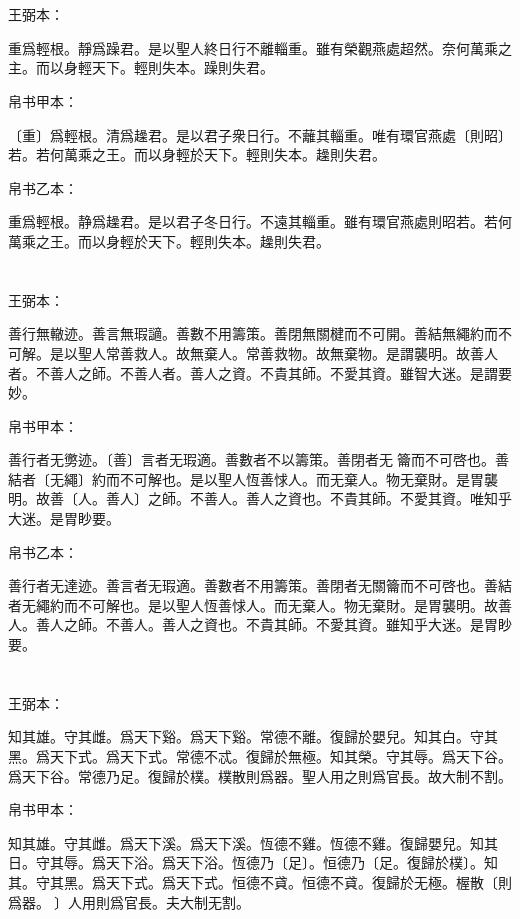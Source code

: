 \documentclass[a5paper]{ctexbook}
\begin{document}
    \chapter{}
    王弼本：

    重爲輕根。靜爲躁君。是以聖人終日行不離輜重。雖有榮觀燕處超然。奈何萬乘之主。而以身輕天下。輕則失本。躁則失君。

    
    帛书甲本：

    〔重〕爲輕根。清爲趮君。是以君子衆日行。不蘺其輜重。唯有環官燕處〔則昭〕若。若何萬乘之王。而以身輕於天下。輕則失本。趮則失君。

    帛书乙本：

    重爲輕根。静爲趮君。是以君子冬日行。不遠其輜重。雖有環官燕處則昭若。若何萬乘之王。而以身輕於天下。輕則失本。趮則失君。

    \chapter{}
    王弼本：

    善行無轍迹。善言無瑕讁。善數不用籌策。善閉無關楗而不可開。善結無繩約而不可解。是以聖人常善救人。故無棄人。常善救物。故無棄物。是謂襲明。故善人者。不善人之師。不善人者。善人之資。不貴其師。不愛其資。雖智大迷。是謂要妙。

    
    帛书甲本：

    善行者无勶迹。〔善〕言者无瑕適。善數者不以籌策。善閉者无󱁥籥而不可啓也。善結者〔无繩〕約而不可解也。是以聖人恆善㤹人。而无棄人。物无棄財。是胃襲明。故善〔人。善人〕之師。不善人。善人之資也。不貴其師。不愛其資。唯知乎大迷。是胃眇要。

    帛书乙本：

    善行者无達迹。善言者无瑕適。善數者不用籌策。善閉者无關籥而不可啓也。善結者无繩約而不可解也。是以聖人恆善㤹人。而无棄人。物无棄財。是胃襲明。故善人。善人之師。不善人。善人之資也。不貴其師。不愛其資。雖知乎大迷。是胃眇要。

    \chapter{}
    王弼本：

    知其雄。守其雌。爲天下谿。爲天下谿。常德不離。復歸於嬰兒。知其白。守其黑。爲天下式。爲天下式。常德不忒。復歸於無極。知其榮。守其辱。爲天下谷。爲天下谷。常德乃足。復歸於樸。樸散則爲器。聖人用之則爲官長。故大制不割。

    
    帛书甲本：

    知其雄。守其雌。爲天下溪。爲天下溪。恆德不雞。恆德不雞。復歸嬰兒。知其日。守其辱。爲天下浴。爲天下浴。恆德乃〔足〕。恒德乃〔足。復歸於樸〕。知其。守其黑。爲天下式。爲天下式。恒德不貣。恒德不貣。復歸於无極。楃散〔則爲器。𦔻〕人用則爲官長。夫大制无割。
\end{document}
